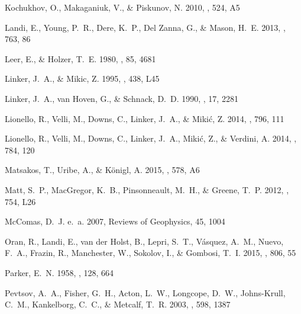 \documentclass[apj]{emulateapj}
\begin{document}
\begin{thebibliography}{42}
{Kochukhov}, O., {Makaganiuk}, V., \& {Piskunov}, N. 2010, \aap, 524, A5

{Landi}, E., {Young}, P.~R., {Dere}, K.~P., {Del Zanna}, G., \& {Mason}, H.~E.
  2013, \apj, 763, 86

{Leer}, E., \& {Holzer}, T.~E. 1980, \jgr, 85, 4681

{Linker}, J.~A., \& {Mikic}, Z. 1995, \apjl, 438, L45

{Linker}, J.~A., {van Hoven}, G., \& {Schnack}, D.~D. 1990, \grl, 17, 2281

{Lionello}, R., {Velli}, M., {Downs}, C., {Linker}, J.~A., \& {Miki{\'c}}, Z.
  2014{}, \apj, 796, 111

{Lionello}, R., {Velli}, M., {Downs}, C., {Linker}, J.~A., {Miki{\'c}}, Z., \&
  {Verdini}, A. 2014{}, \apj, 784, 120

{Matsakos}, T., {Uribe}, A., \& {K{\"o}nigl}, A. 2015, \aap, 578, A6

{Matt}, S.~P., {MacGregor}, K.~B., {Pinsonneault}, M.~H., \& {Greene}, T.~P.
  2012, \apj, 754, L26

{McComas}, D.~J. e.~a. 2007, Reviews of Geophysics, 45, 1004

{Oran}, R., {Landi}, E., {van der Holst}, B., {Lepri}, S.~T., {V{\'a}squez},
  A.~M., {Nuevo}, F.~A., {Frazin}, R., {Manchester}, W., {Sokolov}, I., \&
  {Gombosi}, T.~I. 2015, \apj, 806, 55

{Parker}, E.~N. 1958, \apj, 128, 664

{Pevtsov}, A.~A., {Fisher}, G.~H., {Acton}, L.~W., {Longcope}, D.~W.,
  {Johns-Krull}, C.~M., {Kankelborg}, C.~C., \& {Metcalf}, T.~R. 2003, \apj,
  598, 1387


\end{thebibliography}
\end{document}
